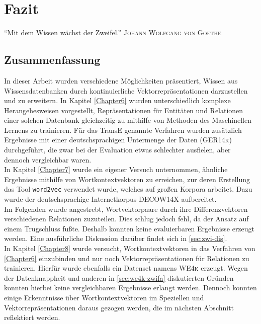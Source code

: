 
\chapter{Fazit} %

\label{Chapter9} %


\begin{itquote}
  ``Mit dem Wissen wächst der Zweifel.''
  \flushright
  \textsc{Johann Wolfgang von Goethe}
\end{itquote}

\section{Zusammenfassung}

In dieser Arbeit wurden verschiedene Möglichkeiten präsentiert, Wissen aus Wissensdatenbanken durch kontinuierliche Vektorrepräsentationen
darzustellen und zu erweitern. In Kapitel \ref{Chapter6} wurden unterschiedlich komplexe Herangehesweisen vorgestellt, Repräsentationen
für Entitäten und Relationen einer solchen Datenbank gleichzeitig zu mithilfe von Methoden des Maschinellen Lernens zu trainieren.
Für das TransE genannte Verfahren wurden zusätzlich Ergebnisse mit einer deutschsprachigen Untermenge der Daten (\textsc{GER14k})
durchgeführt, die zwar bei der Evaluation etwas schlechter ausfielen, aber dennoch vergleichbar waren.\\

In Kapitel \ref{Chapter7} wurde ein eigener Versuch unternommen, ähnliche Ergebnisse mithilfe von Wortkontextvektoren
zu erreichen, zur deren Erstellung das Tool \verb|word2vec| verwendet wurde, welches auf großen Korpora arbeitet. Dazu
wurde der deutschsprachige Internetkorpus \textsc{DECOW14X} aufbereitet.\\
Im Folgenden wurde angestrebt, Wortvektorpaare durch ihre Differenzvektoren verschiedenen Relationen zuzuteilen. Dies schlug
jedoch fehl, da der Ansatz auf einem Trugschluss fußte. Deshalb konnten keine evaluierbaren Ergebnisse erzeugt werden.
Eine ausführliche Diskussion darüber findet sich in \ref{sec:zwi-dis}.\\

In Kapitel \ref{Chapter8} wurde versucht, Wortkontextvektoren in das Verfahren von \ref{Chapter6} einzubinden und nur
noch Vektorrepräsentationen für Relationen zu trainieren. Hierfür wurde ebenfalls ein Datenset namens \textsc{WE4k}
erzeugt. Wegen der Datenknappheit und anderen in \ref{sec:we4k-zwifa} diskutierten Gründen konnten hierbei keine vergleichbaren Ergebnisse
erlangt werden. Dennoch konnten einige Erkenntnisse über Wortkontextvektoren im Speziellen und Vektorrepräsentationen
daraus gezogen werden, die im nächsten Abschnitt reflektiert werden.

